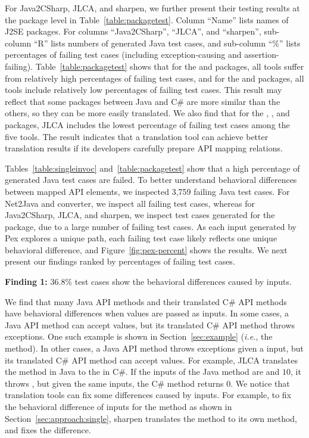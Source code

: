 For Java2CSharp, JLCA, and sharpen, we further present their testing results at the package level in Table~\ref{table:packagetest}. Column ``Name'' lists names of J2SE packages. For columns ``Java2CSharp'', ``JLCA'', and ``sharpen'', sub-column ``R'' lists numbers of generated Java test cases, and sub-column ``\%'' lists percentages of failing test cases (including exception-causing and assertion-failing). Table~\ref{table:packagetest} shows that for the  and  packages, all tools suffer from relatively high percentages of failing test cases, and for the  and  packages, all tools include relatively low percentages of failing test cases. This result may reflect that some packages between Java and C\# are more similar than the others, so they can be more easily translated. We also find that for the , , and  packages, JLCA includes the lowest percentage of failing test cases among the five tools. The result indicates that a translation tool can achieve better translation results if its developers carefully prepare API mapping relations.


Tables~\ref{table:singleinvoc} and~\ref{table:packagetest} show that a high percentage of generated Java test cases are failed. To better understand behavioral differences between mapped API elements, we inspected 3,759 failing Java test cases. For Net2Java and converter, we inspect all failing test cases, whereas for Java2CSharp, JLCA, and sharpen, we inspect test cases generated for the  package, due to a large number of failing test cases. As each input generated by Pex explores a unique path, each failing test case likely reflects one unique behavioral difference, and Figure~\ref{fig:pex-percent} shows the results. We next present our findings ranked by percentages of failing test cases.


\textbf{Finding 1:} 36.8\% test cases show the behavioral differences caused by  inputs.

We find that many Java API methods and their translated C\# API methods have behavioral differences when  values are passed as inputs. In some cases, a Java API method can accept  values, but its translated C\# API method throws exceptions. One such example is shown in Section~\ref{sec:example} (\emph{i.e.}, the  method). In other cases, a Java API method throws exceptions given a  input, but its translated C\# API method can accept  values. For example, JLCA translates the  method in Java to the  in C\#. If the inputs of the Java method are  and $10$, it throws , but given the same inputs, the C\# method returns 0. We notice that translation tools can fix some differences caused by  inputs. For example, to fix the behavioral difference of  inputs for the  method as shown in Section~\ref{sec:approach:single}, sharpen translates the method to its own method, and fixes the difference.

